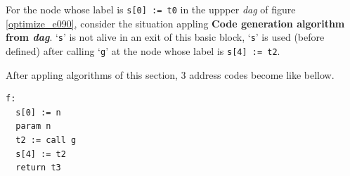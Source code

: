 \begin{Example}
For the node whose label is {\tt{s[0] := t0}} in
the uppper {\em dag} of figure \ref{optimize_e090},
consider the situation appling
{\bf Code generation algorithm from {\em dag}}.
`{\tt{s}}' is not alive in an exit of this basic block,
`{\tt{s}}' is used (before defined) after calling `{\tt{g}}'
at the node whose label is {\tt{s[4] := t2}}.

After appling algorithms of this section,
3 address codes become like bellow.
\begin{verbatim}
f:
  s[0] := n
  param n
  t2 := call g
  s[4] := t2
  return t3
\end{verbatim}
\end{Example}

\begin{Example}
\label{optimize_e092}
\begin{verbatim}


\end{verbatim}
\end{Example}
